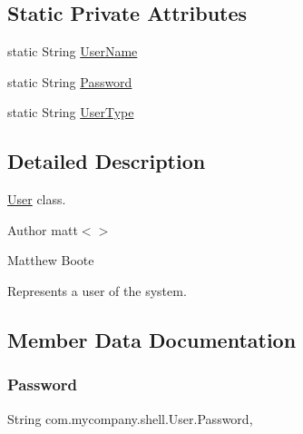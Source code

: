 \subsection*{Static Private Attributes}
\begin{DoxyCompactItemize}
\item 
static String \hyperlink{classcom_1_1mycompany_1_1shell_1_1User_aa5b0c0ea45b78cd0e6ed1a654c8e08da}{User\+Name}
\item 
static String \hyperlink{classcom_1_1mycompany_1_1shell_1_1User_a97addebba6620b23c6ad9a74cc2d4d97}{Password}
\item 
static String \hyperlink{classcom_1_1mycompany_1_1shell_1_1User_a7adda82096915c29abc7abdfd999d24d}{User\+Type}
\end{DoxyCompactItemize}


\subsection{Detailed Description}
\hyperlink{classcom_1_1mycompany_1_1shell_1_1User}{User} class. 

\begin{DoxyAuthor}{Author}
matt$<$$>$

Matthew Boote
\end{DoxyAuthor}
Represents a user of the system. 

\subsection{Member Data Documentation}
\mbox{\label{classcom_1_1mycompany_1_1shell_1_1User_a97addebba6620b23c6ad9a74cc2d4d97}} 
\subsubsection{\texorpdfstring{Password}{Password}}
{\footnotesize\ttfamily String com.\+mycompany.\+shell.\+User.\+Password\hspace{0.3cm}{\ttfamily [static]}, {\ttfamily [private]}}

\mbox{\label{classcom_1_1mycompany_1_1shell_1_1User_aa5b0c0ea45b78cd0e6ed1a654c8e08da}} 
